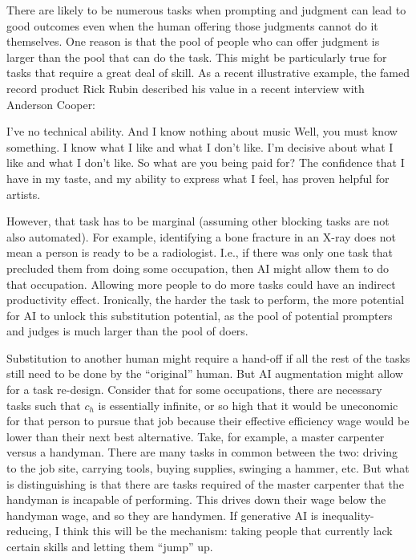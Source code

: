 \documentclass{article}
\begin{document}
There are likely to be numerous tasks when prompting and judgment can lead to good outcomes even when the human offering those judgments cannot do it themselves.
One reason is that the pool of people who can offer judgment is larger than the pool that can do the task. 
This might be particularly true for tasks that require a great deal of skill.
As a recent illustrative example,  the famed record product Rick Rubin described his value in a recent interview with Anderson Cooper:
\begin{dialogue}
 I’ve no technical ability. And I know nothing about music
 Well, you must know something.
 I know what I like and what I don’t like. I’m decisive about what I like and what I don’t like.
 So what are you being paid for?
 The confidence that I have in my taste, and my ability to express what I feel, has proven helpful for artists.
\end{dialogue}

However, that task has to be marginal (assuming other blocking tasks are not also automated). 
For example, identifying a bone fracture in an X-ray does not mean a person is ready to be a radiologist.
I.e., if there was only one task that precluded them from doing some occupation, then AI might allow them to do that occupation.
Allowing more people to do more tasks could have an indirect productivity effect. 
Ironically, the harder the task to perform, the more potential for AI to unlock this substitution potential, as the pool of potential prompters and judges is much larger than the pool of doers.

Substitution to another human might require a hand-off if all the rest of the tasks still need to be done by the ``original'' human. 
But AI augmentation might allow for a task re-design. 
Consider that for some occupations, there are necessary tasks such that $c_h$ is essentially infinite, or so high that it would be uneconomic for that person to pursue that job because their effective efficiency wage would be lower than their next best alternative.  
Take, for example, a master carpenter versus a handyman.
There are many tasks in common between the two: driving to the job site, carrying tools, buying supplies, swinging a hammer, etc.
But what is distinguishing is that there are tasks required of the master carpenter that the handyman is incapable of performing. 
This drives down their wage below the handyman wage, and so they are handymen.
If generative AI is inequality-reducing, I think this will be the mechanism: taking people that currently lack certain skills and letting them ``jump'' up. 
\end{document}
